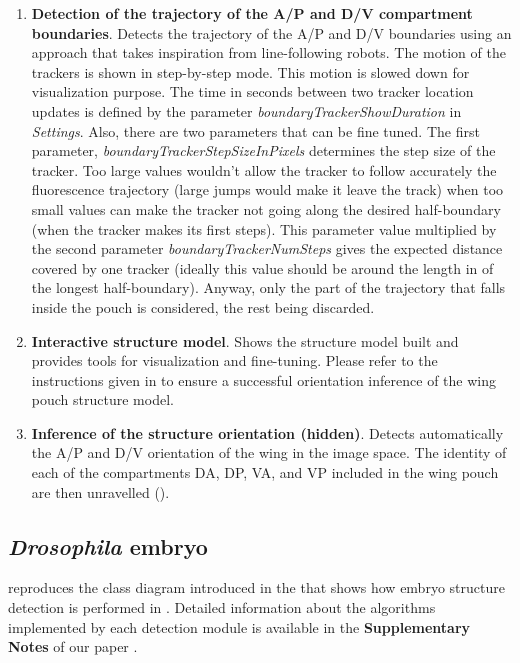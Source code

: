 \begin{enumerate}
 \item \textbf{Detection of the trajectory of the A/P and D/V compartment boundaries}. Detects the trajectory of the A/P and D/V boundaries using an approach that takes inspiration from line-following robots. The motion of the trackers is shown in step-by-step mode. This motion is slowed down for visualization purpose. The time in seconds between two tracker location updates is defined by the parameter \textit{boundaryTrackerShowDuration} in \textit{Settings}. Also, there are two parameters that can be fine tuned. The first parameter, \textit{boundaryTrackerStepSizeInPixels} determines the step size of the tracker. Too large values wouldn't allow the tracker to follow accurately the fluorescence trajectory (large jumps would make it leave the track) when too small values can make the tracker not going along the desired half-boundary (when the tracker makes its first steps). This parameter value multiplied by the second parameter \textit{boundaryTrackerNumSteps} gives the expected distance covered by one tracker (ideally this value should be around the length in \px of the longest half-boundary). Anyway, only the part of the trajectory that falls inside the pouch is considered, the rest being discarded.
 \item \textbf{Interactive structure model}. Shows the structure model built and provides tools for visualization and fine-tuning. Please refer to the instructions given in  to ensure a successful orientation inference of the wing pouch structure model.
 \item \textbf{Inference of the structure orientation (hidden)}. Detects automatically the A/P and D/V orientation of the wing in the image space. The identity of each of the compartments DA, DP, VA, and VP included in the wing pouch are then unravelled ().
\end{enumerate}

\subsection{\textit{Drosophila} embryo}\label{sec:embryo_detection}
 reproduces the class diagram introduced in the \wingjDeveloperGuide that shows how embryo structure detection is performed in \wingj. Detailed information about the algorithms implemented by each detection module is available in the \textbf{Supplementary Notes} of our paper \autocite{schaffter2013}.

